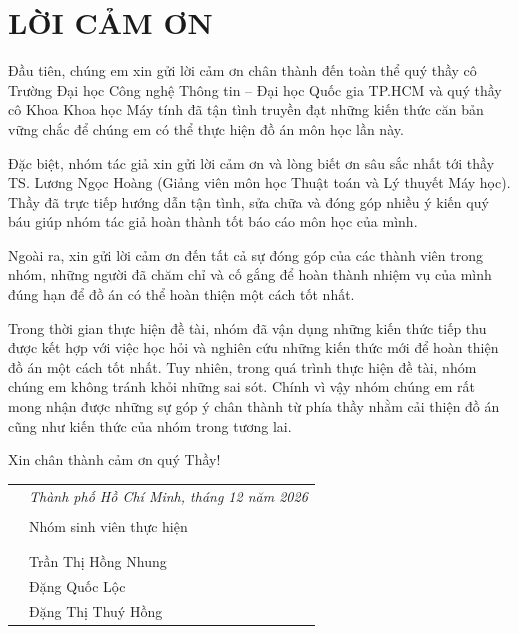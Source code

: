 \chapter*{LỜI CẢM ƠN}
\vspace*{1.5ex}

Đầu tiên, chúng em xin gửi lời cảm ơn chân thành đến toàn thể quý thầy cô Trường Đại học Công nghệ Thông tin -- Đại học Quốc gia TP.HCM và quý thầy cô Khoa Khoa học Máy tính đã tận tình truyền đạt những kiến thức căn bản vững chắc để chúng em có thể thực hiện đồ án môn học lần này.

Đặc biệt, nhóm tác giả xin gửi lời cảm ơn và lòng biết ơn sâu sắc nhất tới thầy TS. Lương Ngọc Hoàng (Giảng viên môn học Thuật toán và Lý thuyết Máy học). Thầy đã trực tiếp hướng dẫn tận tình, sửa chữa và đóng góp nhiều ý kiến quý báu giúp nhóm tác giả hoàn thành tốt báo cáo môn học của mình.

Ngoài ra, xin gửi lời cảm ơn đến tất cả sự đóng góp của các thành viên trong nhóm, những người đã chăm chỉ và cố gắng để hoàn thành nhiệm vụ của mình đúng hạn để đồ án có thể hoàn thiện một cách tốt nhất.

Trong thời gian thực hiện đề tài, nhóm đã vận dụng những kiến thức tiếp thu được kết hợp với việc học hỏi và nghiên cứu những kiến thức mới để hoàn thiện đồ án một cách tốt nhất. Tuy nhiên, trong quá trình thực hiện đề tài, nhóm chúng em không tránh khỏi những sai sót. Chính vì vậy nhóm chúng em rất mong nhận được những sự góp ý chân thành từ phía thầy nhằm cải thiện đồ án cũng như kiến thức của nhóm trong tương lai.

Xin chân thành cảm ơn quý Thầy!

{
\begin{table}[ht]
\centering
\begin{tabular}{>{\centering}m{}>{\centering\arraybackslash}m{}}
 & \textit{Thành phố Hồ Chí Minh, tháng 12 năm 2026} \\ & \\
 & Nhóm sinh viên thực hiện \\
 & \\ &  \\
 & Trần Thị Hồng Nhung \\
 & Đặng Quốc Lộc \\
 & Đặng Thị Thuý Hồng
\end{tabular}
\end{table}
}